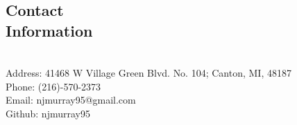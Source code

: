 \documentclass[margin,line]{resume}
\begin{document}
\begin{resume}
    \section{\mysidestyle Contact\\Information}
    \hfill \\

    Address: 41468 W Village Green Blvd. No. 104; Canton, MI, 48187 \\
    Phone: (216)-570-2373 \\
    Email: njmurray95@gmail.com \\
    Github: njmurray95

\end{resume}
\end{document}
